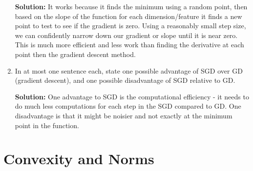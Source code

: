 \documentclass[shortlabels]{article}
\begin{document}
\begin{aprob}
\begin{enumerate}
      \textbf{Solution:} It works because it finds the minimum using a random point, then based on the slope of the function for each dimension/feature it finds a new point to test to see if the gradient is zero. Using a reasonably small step size, we can confidently narrow down our gradient or slope until it is near zero. This is much more efficient and less work than finding the derivative at each point then the gradient descent method.
      \newpage
      \item {} In at most one sentence each, state one possible advantage of SGD over GD (gradient descent), and one possible disadvantage of SGD relative to GD.

        \textbf{Solution:} One advantage to SGD is the computational efficiency - it needs to do much less computations for each step in the SGD compared to GD. One disadvantage is that it might be noisier and not exactly at the minimum point in the function.
    \end{enumerate}

\end{aprob}

\newpage

\section*{Convexity and Norms }
\end{document}
